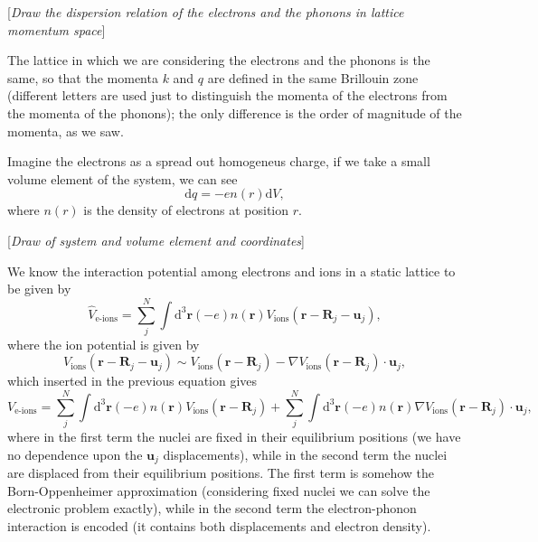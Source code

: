     [\textit{Draw the dispersion relation of the electrons and the phonons in lattice momentum space}]

The lattice in which we are considering the electrons and the phonons is the same, so that the momenta \(k\) and \(q\) are defined in the same Brillouin zone (different letters are used just to distinguish the momenta of the electrons from the momenta of the phonons); the only difference is the order of magnitude of the momenta, as we saw.

Imagine the electrons as a spread out homogeneus charge, if we take a small volume element of the system, we can see
\[
    \mathrm{d} q = -e n(r) \mathrm{d} V,
\]
where \(n(r)\) is the density of electrons at position \(r\).

    [\textit{Draw of system and volume element and coordinates}]

We know the interaction potential among electrons and ions in a static lattice to be given by
\[
    \hat{V}_{\text{e-ions}} = \sum_{j}^N \int \mathrm{d}^3 \mathbf{r} (-e) n(\mathbf{r}) V_{\text{ions}}(\mathbf{r} - \mathbf{R}_j - \mathbf{u}_j),
\]
where the ion potential is given by
\[
    V_\text{ions}(\mathbf{r} - \mathbf{R}_j - \mathbf{u}_j) \sim V_\text{ions}(\mathbf{r} - \mathbf{R}_j) - \nabla V_\text{ions}(\mathbf{r} - \mathbf{R}_j) \cdot \mathbf{u}_j,
\]
which inserted in the previous equation gives
\[
    V_{\text{e-ions}} = \sum_{j}^N \int \mathrm{d}^3 \mathbf{r} (-e) n(\mathbf{r}) V_{\text{ions}}(\mathbf{r} - \mathbf{R}_j) + \sum_{j}^N \int \mathrm{d}^3 \mathbf{r} (-e) n(\mathbf{r}) \nabla V_{\text{ions}}(\mathbf{r} - \mathbf{R}_j) \cdot \mathbf{u}_j,
\]
where in the first term the nuclei are fixed in their equilibrium positions (we have no dependence upon the \(\mathbf{u}_j\) displacements), while in the second term the nuclei are displaced from their equilibrium positions. The first term is somehow the Born-Oppenheimer approximation (considering fixed nuclei we can solve the electronic problem exactly), while in the second term the electron-phonon interaction is encoded (it contains both displacements and electron density).

